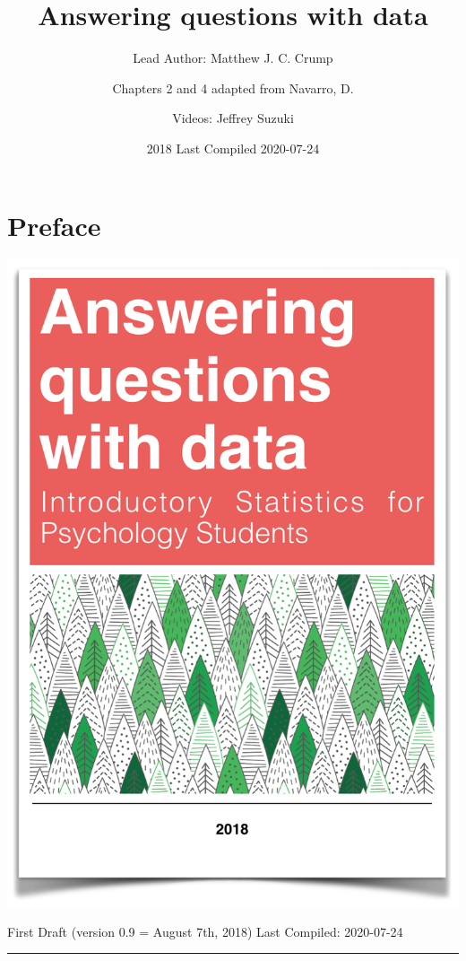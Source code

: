 \documentclass[]{book}
\title{Answering questions with data}
\author{Lead Author: Matthew J. C. Crump \and Chapters 2 and 4 adapted from Navarro, D. \and Videos: Jeffrey Suzuki}
\date{2018 Last Compiled 2020-07-24}
\begin{document}
\maketitle

{
\setcounter{tocdepth}{1}
\tableofcontents
}
\hypertarget{preface}{%
\chapter*{Preface}\label{preface}}

\begin{center}\includegraphics{TextbookCover} \end{center}

First Draft (version 0.9 = August 7th, 2018)
Last Compiled: 2020-07-24

\begin{center}\rule{0.5\linewidth}{0.5pt}\end{center}
\end{document}
